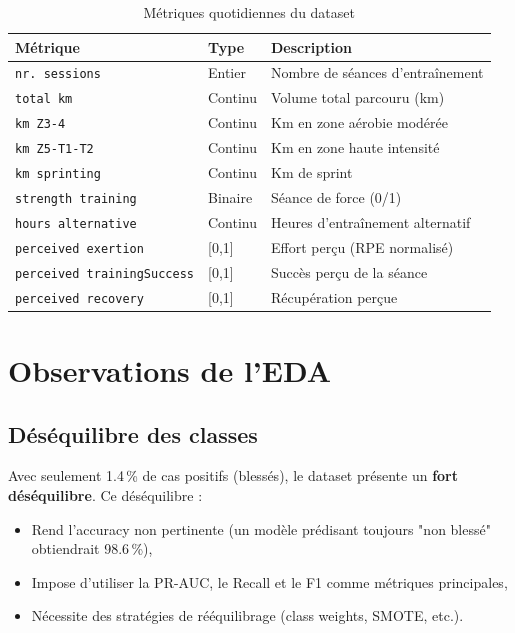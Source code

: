\documentclass[12pt,a4paper]{report}
\begin{document}
\begin{table}[H]
\centering
\begin{tabular}{llp{6cm}}
\toprule
\textbf{Métrique} & \textbf{Type} & \textbf{Description} \\
\midrule
\texttt{nr. sessions} & Entier & Nombre de séances d'entraînement \\
\texttt{total km} & Continu & Volume total parcouru (km) \\
\texttt{km Z3-4} & Continu & Km en zone aérobie modérée \\
\texttt{km Z5-T1-T2} & Continu & Km en zone haute intensité \\
\texttt{km sprinting} & Continu & Km de sprint \\
\texttt{strength training} & Binaire & Séance de force (0/1) \\
\texttt{hours alternative} & Continu & Heures d'entraînement alternatif \\
\texttt{perceived exertion} & [0,1] & Effort perçu (RPE normalisé) \\
\texttt{perceived trainingSuccess} & [0,1] & Succès perçu de la séance \\
\texttt{perceived recovery} & [0,1] & Récupération perçue \\
\bottomrule
\end{tabular}
\caption{Métriques quotidiennes du dataset}
\end{table}

\section{Observations de l'EDA}

\subsection{Déséquilibre des classes}

Avec seulement 1.4\,\% de cas positifs (blessés), le dataset présente un
\textbf{fort déséquilibre}. Ce déséquilibre :
\begin{itemize}
  \item Rend l'accuracy non pertinente (un modèle prédisant toujours "non blessé" obtiendrait 98.6\,\%),
  \item Impose d'utiliser la PR-AUC, le Recall et le F1 comme métriques principales,
  \item Nécessite des stratégies de rééquilibrage (class weights, SMOTE, etc.).
\end{itemize}
\end{document}
